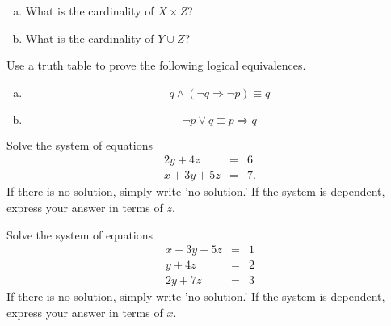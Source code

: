 \documentclass[12pt]{amsart}
\begin{document}
\begin{thm}[10 Points]
  \begin{enumerate}[(a)]
  \item
    What is the cardinality of $X \times Z$?
    \vspace{1in}
  \item
    What is the cardinality of $Y \cup Z$?
    \vspace{1in}
  \end{enumerate}
\end{thm}
\newpage

\begin{thm}[10 Points]\label{ex9}
  Use a truth table to prove the following logical equivalences.
  \begin{enumerate}[(a)]
  \item
    $$q \wedge (\neg q \Rightarrow \neg p) \equiv q$$
    \vspace{2in}
  \item
    $$\neg p \vee q \equiv p \Rightarrow q$$
    \vspace{2in}
  \end{enumerate}
\end{thm}

\newpage
\begin{thm}[15 Points]\label{ex2}
  Solve the system of equations
  \begin{eqnarray*}
    2y + 4z &=& 6\\
    x + 3y + 5z &=& 7.
  \end{eqnarray*}
  If there is no solution, simply write 'no solution.'  If the system is dependent, express your answer in terms of $z$.
  \vspace{2in}
\end{thm}

\newpage

\begin{thm}[15 Points]\label{ex3}
  Solve the system of equations
  \begin{eqnarray*}
    x + 3y + 5z &=& 1\\
    y + 4z &=& 2\\
    2y + 7z &=& 3
  \end{eqnarray*}
  If there is no solution, simply write 'no solution.'  If the system is dependent, express your answer in terms of $x$.
\end{thm}

\newpage
\end{document}
